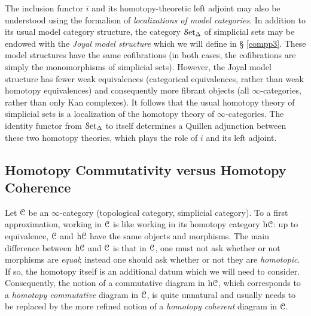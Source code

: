 \begin{Didn't Read}
\begin{remark}
The inclusion functor $i$ and its homotopy-theoretic left adjoint
may also be understood using the formalism of {\it
localizations of model categories}. In addition to its usual model
category structure, the category $\operatorname{\mathcal{S}et_{\Delta}}$ of simplicial sets may be
endowed with the {\it Joyal model structure} which we will define in \S
\ref{compp3}. These model structures have the same cofibrations (in both cases, the
cofibrations are simply the monomorphisms of simplicial sets).
However, the Joyal model structure has fewer weak equivalences
(categorical equivalences, rather than weak homotopy equivalences)
and consequently more fibrant objects (all $\infty$-categories,
rather than only Kan complexes). It follows that the usual
homotopy theory of simplicial sets is a
localization of the homotopy theory of $\infty$-categories. The
identity functor from $\operatorname{\mathcal{S}et_{\Delta}}$ to itself determines a Quillen
adjunction between these two homotopy theories, which plays the
role of $i$ and its left adjoint.
\end{remark}

\subsection{Homotopy Commutativity versus Homotopy Coherence}\label{comcoh}

Let $\operatorname{\mathcal{C}}$ be an $\infty$-category (topological category, simplicial category). 
To a first approximation,
working in $\operatorname{\mathcal{C}}$ is like working in its homotopy category $\rm{h} \it{
\operatorname{\mathcal{C}}}$: up to equivalence, $\operatorname{\mathcal{C}}$ and $\rm{h} \it{\operatorname{\mathcal{C}}}$ have the same
objects and morphisms. The main difference between $\rm{h} \it{\operatorname{\mathcal{C}}}$ and
$\operatorname{\mathcal{C}}$ is that in $\operatorname{\mathcal{C}}$, one must not ask whether or not
morphisms are {\em equal}; instead one should ask whether or not they are {\it homotopic}. If so, the homotopy itself is an additional datum which we will need to consider. Consequently, the notion of a commutative diagram in
$\rm{h} \it{\operatorname{\mathcal{C}}}$, which corresponds to a {\it homotopy commutative}
diagram in $\operatorname{\mathcal{C}}$, is quite unnatural and usually needs to be
replaced by the more refined notion of a {\it homotopy coherent}
diagram in $\operatorname{\mathcal{C}}$.


\end{Didn't Read}
